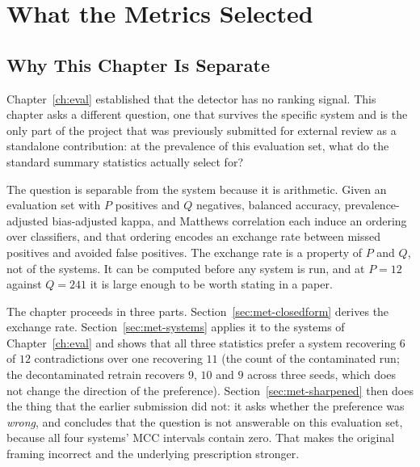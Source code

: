 %
%
%

\chapter{What the Metrics Selected}
\label{ch:metrics}

\section{Why This Chapter Is Separate}
\label{sec:met-overview}

Chapter~\ref{ch:eval} established that the detector has no ranking signal. This
chapter asks a different question, one that survives the specific system and is
the only part of the project that was previously submitted for external review
as a standalone contribution: at the prevalence of this evaluation set, what do
the standard summary statistics actually select for?

The question is separable from the system because it is arithmetic. Given an
evaluation set with $P$ positives and $Q$ negatives, balanced accuracy,
prevalence-adjusted bias-adjusted kappa, and Matthews correlation each induce an
ordering over classifiers, and that ordering encodes an exchange rate between
missed positives and avoided false positives. The exchange rate is a property of
$P$ and $Q$, not of the systems. It can be computed before any system is run,
and at $P = 12$ against $Q = 241$ it is large enough to be worth stating in a
paper.

The chapter proceeds in three parts. Section~\ref{sec:met-closedform} derives
the exchange rate. Section~\ref{sec:met-systems} applies it to the systems of
Chapter~\ref{ch:eval} and shows that all three statistics prefer a system
recovering $6$ of $12$ contradictions over one recovering $11$ (the count of the
contaminated run; the decontaminated retrain recovers $9$, $10$ and $9$ across
three seeds, which does not change the direction of the preference).
Section~\ref{sec:met-sharpened} then does the thing that the earlier submission
did not: it asks whether the preference was \emph{wrong}, and concludes that the
question is not answerable on this evaluation set, because all four systems' MCC
intervals contain zero. That makes the original framing incorrect and the
underlying prescription stronger.

